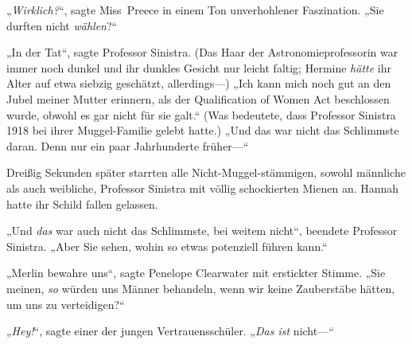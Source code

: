 „\emph{Wirklich?}“, sagte Miss~Preece in einem Ton unverhohlener Faszination. „Sie durften nicht \emph{wählen}?“

„In der Tat“, sagte Professor Sinistra. (Das Haar der Astronomieprofessorin war immer noch dunkel und ihr dunkles Gesicht nur leicht faltig; Hermine \emph{hätte} ihr Alter auf etwa siebzig geschätzt, allerdings—) „Ich kann mich noch gut an den Jubel meiner Mutter erinnern, als der Qualification of Women Act beschlossen wurde, obwohl es gar nicht für sie galt.“ (Was bedeutete, dass Professor Sinistra 1918 bei ihrer Muggel-Familie gelebt hatte.) „Und das war nicht das Schlimmste daran. Denn nur ein paar Jahrhunderte früher—“

Dreißig Sekunden später starrten alle Nicht-Muggel-stämmigen, sowohl männliche als auch weibliche, Professor Sinistra mit völlig schockierten Mienen an. Hannah hatte ihr Schild fallen gelassen.

„Und \emph{das} war auch nicht das Schlimmste, bei weitem nicht“, beendete Professor Sinistra. „Aber Sie sehen, wohin so etwas potenziell führen kann.“

„Merlin bewahre uns“, sagte Penelope Clearwater mit erstickter Stimme. „Sie meinen, \emph{so} würden uns Männer behandeln, wenn wir keine Zauberstäbe hätten, um uns zu verteidigen?“

„\emph{Hey!}“, sagte einer der jungen Vertrauensschüler. „\emph{Das ist} nicht—“


